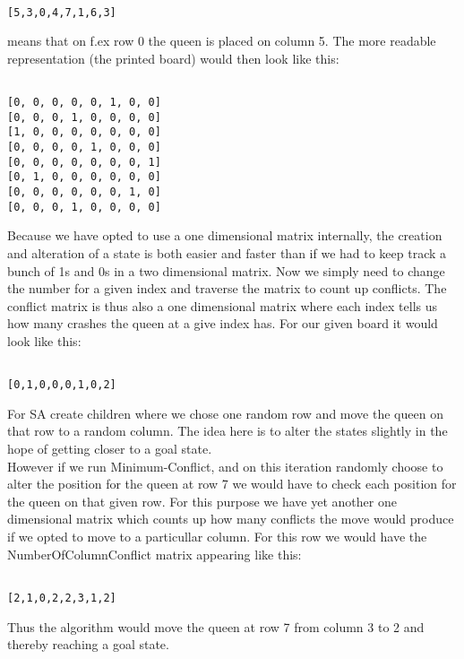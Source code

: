 \documentclass[12pt, a4paper]{article}
\begin{document}
\begin{verbatim}

[5,3,0,4,7,1,6,3]

\end{verbatim}
\noindent
means that on f.ex row 0 the queen is placed on column 5. The more readable representation (the printed board) would then look like this:

\begin{verbatim}

[0, 0, 0, 0, 0, 1, 0, 0]
[0, 0, 0, 1, 0, 0, 0, 0]
[1, 0, 0, 0, 0, 0, 0, 0]
[0, 0, 0, 0, 1, 0, 0, 0]
[0, 0, 0, 0, 0, 0, 0, 1]
[0, 1, 0, 0, 0, 0, 0, 0]
[0, 0, 0, 0, 0, 0, 1, 0]
[0, 0, 0, 1, 0, 0, 0, 0]

\end{verbatim}

\noindent
Because we have opted to use a one dimensional matrix internally, the creation and alteration of a state is both easier and faster than if we had to keep track a bunch of 1s and 0s in a two dimensional matrix. Now we simply need to change the number for a given index and traverse the matrix to count up conflicts. The conflict matrix is thus also a one dimensional matrix where each index tells us how many crashes the queen at a give index has. For our given board it would look like this:

\begin{verbatim}

[0,1,0,0,0,1,0,2]

\end{verbatim}

\noindent
For SA create children where we chose one random row and move the queen on that row to a random column. The idea here is to alter the states slightly in the hope of getting closer to a goal state. 
\\
However if we run Minimum-Conflict, and on this iteration randomly choose to alter the position for the queen at row 7 we would have to check each position for the queen on that given row. For this purpose we have yet another one dimensional matrix which counts up how many conflicts the move would produce if we opted to move to a particullar column. For this row we would have the NumberOfColumnConflict matrix appearing like this:

\begin{verbatim}

[2,1,0,2,2,3,1,2]

\end{verbatim}
\noindent
Thus the algorithm would move the queen at row 7 from column 3 to 2 and thereby reaching a goal state.
\end{document}
